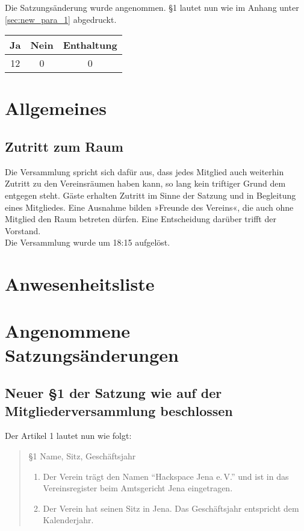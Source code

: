 \documentclass{scrartcl}
\begin{document}
Die Satzungsänderung wurde angenommen. §1 lautet nun wie im Anhang unter
\ref{sec:new_para_1} abgedruckt.

\begin{table}[h!]
    \centering
    \begin{tabular}{c|c|c}
        \textbf{Ja} & \textbf{Nein} & \textbf{Enthaltung} \\ \hline
        12 & 0 & 0
    \end{tabular}
\end{table}

\section{Allgemeines}

\subsection{Zutritt zum Raum}
Die Versammlung spricht sich dafür aus, dass jedes Mitglied auch
weiterhin Zutritt zu den Vereinsräumen haben kann, so lang kein
triftiger Grund dem entgegen steht.
Gäste erhalten Zutritt im Sinne der Satzung und in Begleitung eines
Mitgliedes.
Eine Ausnahme bilden »Freunde des Vereins«, die auch ohne Mitglied den
Raum betreten dürfen.
Eine Entscheidung darüber trifft der Vorstand. \\[1ex]

Die Versammlung wurde um 18:15 aufgelöst.

\newpage 
\appendix{}
\section{Anwesenheitsliste}
\newpage 
\section{Angenommene Satzungsänderungen}
\subsection{Neuer §1 der Satzung wie auf der Mitgliederversammlung beschlossen}
Der Artikel 1 lautet nun wie folgt: 

\begin{quote}
\label{sec:new_para_1}

§1 Name, Sitz, Geschäftsjahr

	\begin{enumerate}
		\item Der Verein trägt den Namen "`Hackspace Jena e.\,V."' und ist in das
			Vereinsregister beim Amtsgericht Jena eingetragen.
		\item Der Verein hat seinen Sitz in Jena. Das Geschäftsjahr entspricht
			dem Kalenderjahr.
	\end{enumerate}
\end{quote}
\end{document}
